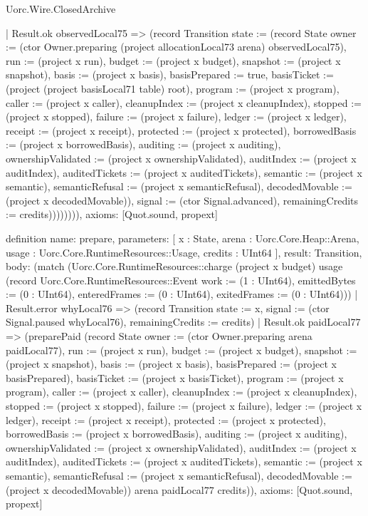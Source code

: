 \begin{lexlean}{Uorc.Wire.ClosedArchive}
\begin{semanticmodule}
{              | Result.ok observedLocal75 => (record Transition {state := (record State {owner := (ctor Owner.preparing (project allocationLocal73 arena) observedLocal75), run := (project x run), budget := (project x budget), snapshot := (project x snapshot), basis := (project x basis), basisPrepared := true, basisTicket := (project (project basisLocal71 table) root), program := (project x program), caller := (project x caller), cleanupIndex := (project x cleanupIndex), stopped := (project x stopped), failure := (project x failure), ledger := (project x ledger), receipt := (project x receipt), protected := (project x protected), borrowedBasis := (project x borrowedBasis), auditing := (project x auditing), ownershipValidated := (project x ownershipValidated), auditIndex := (project x auditIndex), auditedTickets := (project x auditedTickets), semantic := (project x semantic), semanticRefusal := (project x semanticRefusal), decodedMovable := (project x decodedMovable)}), signal := (ctor Signal.advanced), remainingCredits := credits})))))))),
  axioms: [Quot.sound, propext]
}

definition{
  name: prepare,
  parameters: [
    x : State,
    arena : Uorc.Core.Heap::Arena,
    usage : Uorc.Core.RuntimeResources::Usage,
    credits : UInt64
  ],
  result: Transition,
  body: (match (Uorc.Core.RuntimeResources::charge (project x budget) usage (record Uorc.Core.RuntimeResources::Event {work := (1 : UInt64), emittedBytes := (0 : UInt64), enteredFrames := (0 : UInt64), exitedFrames := (0 : UInt64)}))
    | Result.error whyLocal76 => (record Transition {state := x, signal := (ctor Signal.paused whyLocal76), remainingCredits := credits})
    | Result.ok paidLocal77 => (preparePaid (record State {owner := (ctor Owner.preparing arena paidLocal77), run := (project x run), budget := (project x budget), snapshot := (project x snapshot), basis := (project x basis), basisPrepared := (project x basisPrepared), basisTicket := (project x basisTicket), program := (project x program), caller := (project x caller), cleanupIndex := (project x cleanupIndex), stopped := (project x stopped), failure := (project x failure), ledger := (project x ledger), receipt := (project x receipt), protected := (project x protected), borrowedBasis := (project x borrowedBasis), auditing := (project x auditing), ownershipValidated := (project x ownershipValidated), auditIndex := (project x auditIndex), auditedTickets := (project x auditedTickets), semantic := (project x semantic), semanticRefusal := (project x semanticRefusal), decodedMovable := (project x decodedMovable)}) arena paidLocal77 credits)),
  axioms: [Quot.sound, propext]
}


\end{semanticmodule}
\end{lexlean}
